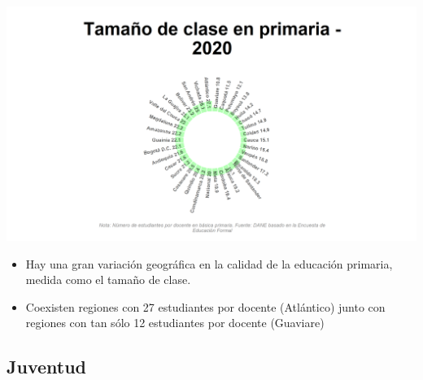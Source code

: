 \documentclass[aspectratio=169]{beamer}
\begin{document}
            \begin{slide}{13} 
                      \begin{imagecolumn}
                \includegraphics[width=\columnwidth]{img/var_228_static.png}
            \end{imagecolumn}
            \begin{textcolumn}
                \begin{itemize}
                    \item Hay una gran variación geográfica en la calidad de la educación primaria, medida como el tamaño de clase. 
                    \item Coexisten regiones con 27 estudiantes por docente (Atlántico) junto con regiones con tan sólo 12 estudiantes por docente (Guaviare)  
                \end{itemize}
            \end{textcolumn}

    \printcolumns
    \end{slide}
    
    
    \subsection{Juventud}
    
\end{document}
